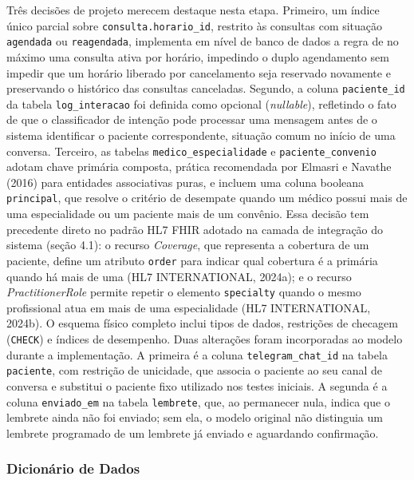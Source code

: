 \documentclass[12pt,a4paper]{extarticle}
\begin{document}
Três decisões de projeto merecem destaque nesta etapa. Primeiro, um índice único parcial sobre \texttt{consulta.horario\_\allowbreak{}id}, restrito às consultas com situação \texttt{agendada} ou \texttt{reagendada}, implementa em nível de banco de dados a regra de no máximo uma consulta ativa por horário, impedindo o duplo agendamento sem impedir que um horário liberado por cancelamento seja reservado novamente e preservando o histórico das consultas canceladas. Segundo, a coluna \texttt{paciente\_\allowbreak{}id} da tabela \texttt{log\_\allowbreak{}interacao} foi definida como opcional (\textit{nullable}), refletindo o fato de que o classificador de intenção pode processar uma mensagem antes de o sistema identificar o paciente correspondente, situação comum no início de uma conversa. Terceiro, as tabelas \texttt{medico\_\allowbreak{}especialidade} e \texttt{paciente\_\allowbreak{}convenio} adotam chave primária composta, prática recomendada por Elmasri e Navathe (2016) para entidades associativas puras, e incluem uma coluna booleana \texttt{principal}, que resolve o critério de desempate quando um médico possui mais de uma especialidade ou um paciente mais de um convênio. Essa decisão tem precedente direto no padrão HL7 FHIR adotado na camada de integração do sistema (seção 4.1): o recurso \textit{Coverage}, que representa a cobertura de um paciente, define um atributo \texttt{order} para indicar qual cobertura é a primária quando há mais de uma (HL7 INTERNATIONAL, 2024a); e o recurso \textit{PractitionerRole} permite repetir o elemento \texttt{specialty} quando o mesmo profissional atua em mais de uma especialidade (HL7 INTERNATIONAL, 2024b). O esquema físico completo inclui tipos de dados, restrições de checagem (\texttt{CHECK}) e índices de desempenho. Duas alterações foram incorporadas ao modelo durante a implementação. A primeira é a coluna \texttt{telegram\_\allowbreak{}chat\_\allowbreak{}id} na tabela \texttt{paciente}, com restrição de unicidade, que associa o paciente ao seu canal de conversa e substitui o paciente fixo utilizado nos testes iniciais. A segunda é a coluna \texttt{enviado\_\allowbreak{}em} na tabela \texttt{lembrete}, que, ao permanecer nula, indica que o lembrete ainda não foi enviado; sem ela, o modelo original não distinguia um lembrete programado de um lembrete já enviado e aguardando confirmação.

\subsubsection{Dicionário de Dados}
\end{document}
